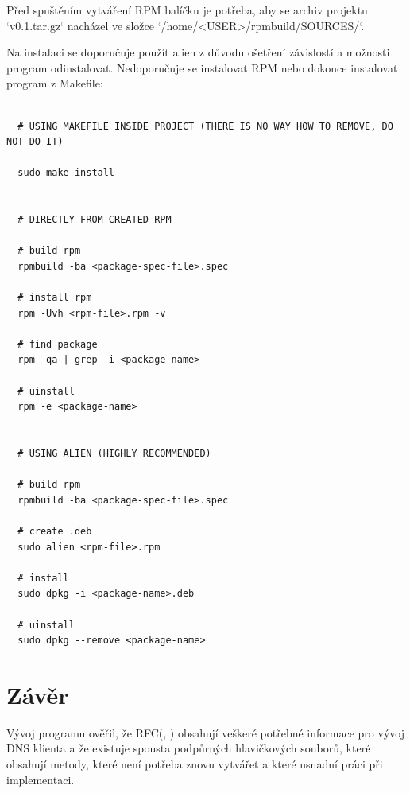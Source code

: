 \documentclass[a4paper,11pt]{article}
\begin{document}
Před spuštěním vytváření RPM balíčku je potřeba, aby se archiv projektu `v0.1.tar.gz` nacházel ve složce `/home/<USER>/rpmbuild/SOURCES/`.

Na instalaci se doporučuje použít alien z důvodu ošetření závislostí a možnosti program odinstalovat. Nedoporučuje se instalovat RPM nebo dokonce instalovat program z Makefile:

  \lstset{language=Bash}
  \begin{lstlisting}[frame=single,breaklines]

  # USING MAKEFILE INSIDE PROJECT (THERE IS NO WAY HOW TO REMOVE, DO NOT DO IT)

  sudo make install


  # DIRECTLY FROM CREATED RPM

  # build rpm
  rpmbuild -ba <package-spec-file>.spec

  # install rpm
  rpm -Uvh <rpm-file>.rpm -v

  # find package
  rpm -qa | grep -i <package-name>

  # uinstall
  rpm -e <package-name>


  # USING ALIEN (HIGHLY RECOMMENDED)

  # build rpm
  rpmbuild -ba <package-spec-file>.spec

  # create .deb
  sudo alien <rpm-file>.rpm

  # install
  sudo dpkg -i <package-name>.deb

  # uinstall
  sudo dpkg --remove <package-name>

\end{lstlisting}

\section{Závěr}

Vývoj programu ověřil, že RFC(\cite{rfc10135}, \cite{rfc13596}) obsahují veškeré potřebné informace pro vývoj DNS klienta a že existuje spousta podpůrných hlavičkových souborů, které obsahují metody, které není potřeba znovu vytvářet a které usnadní práci při implementaci.

\newpage




\end{document}
